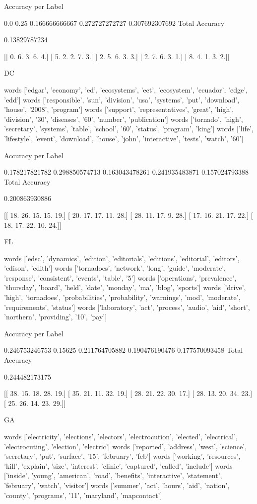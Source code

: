 \documentclass[11pt]{article}
\begin{document}
\begin{verbatium}
Accuracy per Label

0.0
0.25
0.166666666667
0.272727272727
0.307692307692
Total Accuracy

0.13829787234


[[ 0.  6.  3.  6.  4.]
 [ 5.  2.  2.  7.  3.]
 [ 2.  5.  6.  3.  3.]
 [ 2.  7.  6.  3.  1.]
 [ 8.  4.  1.  3.  2.]]


DC


words
['edgar', 'economy', 'ed', 'ecosystems', 'ect', 'ecosystem', 'ecuador', 'edge', 'edd']
words
['responsible', 'sun', 'division', 'usa', 'systems', 'put', 'download', 'house', '2008', 'program']
words
['support', 'representatives', 'great', 'high', 'division', '30', 'diseases', '60', 'number', 'publication']
words
['tornado', 'high', 'secretary', 'systems', 'table', 'school', '60', 'status', 'program', 'king']
words
['life', 'lifestyle', 'event', 'download', 'house', 'john', 'interactive', 'tests', 'watch', '60']

Accuracy per Label

0.178217821782
0.298850574713
0.163043478261
0.241935483871
0.157024793388
Total Accuracy

0.200863930886


[[ 18.  26.  15.  15.  19.]
 [ 20.  17.  17.  11.  28.]
 [ 28.  11.  17.   9.  28.]
 [ 17.  16.  21.  17.  22.]
 [ 18.  17.  22.  10.  24.]]


FL


words
['edsc', 'dynamics', 'edition', 'editorials', 'editions', 'editorial', 'editors', 'edison', 'edith']
words
['tornadoes', 'network', 'long', 'guide', 'moderate', 'response', 'consistent', 'events', 'table', '5']
words
['operations', 'prevalence', 'thursday', 'board', 'held', 'date', 'monday', 'ma', 'blog', 'sports']
words
['drive', 'high', 'tornadoes', 'probabilities', 'probability', 'warnings', 'mod', 'moderate', 'requirements', 'status']
words
['laboratory', 'act', 'process', 'audio', 'aid', 'short', 'northern', 'providing', '10', 'pay']

Accuracy per Label

0.246753246753
0.15625
0.211764705882
0.190476190476
0.177570093458
Total Accuracy

0.244482173175


[[ 38.  15.  18.  28.  19.]
 [ 35.  21.  11.  32.  19.]
 [ 28.  21.  22.  30.  17.]
 [ 28.  13.  20.  34.  23.]
 [ 25.  26.  14.  23.  29.]]


GA


words
['electricity', 'elections', 'electors', 'electrocution', 'elected', 'electrical', 'electrocuting', 'election', 'electric']
words
['reported', 'address', 'west', 'science', 'secretary', 'put', 'surface', '15', 'february', 'feb']
words
['working', 'resources', 'kill', 'explain', 'size', 'interest', 'clinic', 'captured', 'called', 'include']
words
['inside', 'young', 'american', 'road', 'benefits', 'interactive', 'statement', 'february', 'watch', 'visitor']
words
['summer', 'act', 'hours', 'aid', 'nation', 'county', 'programs', '11', 'maryland', 'mapcontact']


\end{verbatium}
\end{document}
